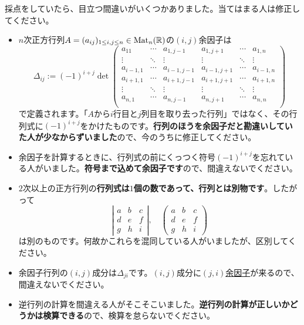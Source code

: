 採点をしていたら、目立つ間違いがいくつかありました。当てはまる人は修正してください。
\begin{itemize}
\item $n$次正方行列$A = (a_{ij})_{1 \leq i, j \leq n} \in \operatorname{Mat}_n(\mathbb{R})$の$(i, j)$余因子は
\[
\Delta_{ij} := (-1)^{i + j} \det
\begin{pmatrix}
a_{11} & \cdots & a_{1, j-1} & a_{1, j + 1} & \cdots & a_{1, n} \\
\vdots & \ddots & \vdots & \vdots & \ddots & \vdots \\
a_{i - 1, 1} & \cdots & a_{i - 1, j-1} & a_{i - 1, j + 1} & \cdots & a_{i - 1, n} \\
a_{i + 1, 1} & \cdots & a_{i + 1, j-1} & a_{i + 1, j + 1} & \cdots & a_{i + 1, n} \\
\vdots & \ddots & \vdots & \vdots & \ddots & \vdots \\
a_{n, 1} & \cdots & a_{n, j-1} & a_{n, j + 1} & \cdots & a_{n, n} \\
\end{pmatrix}
\]
で定義されます。「$A$から$i$行目と$j$列目を取り去った行列」ではなく、その行列式に$(-1)^{i + j}$をかけたものです。\textbf{行列のほうを余因子だと勘違いしていた人が少なからずいました}ので、今のうちに修正してください。
\item 余因子を計算するときに、行列式の前にくっつく符号$(-1)^{i + j}$を忘れている人がいました。\textbf{符号まで込めて余因子です}ので、間違えないでください。
\item $2$次以上の正方行列の\textbf{行列式は$1$個の数であって、行列とは別物です}。したがって
\[
\left|
\begin{array}{ccc}
a & b & c \\
d & e & f \\
g & h & i
\end{array}
\right|, \quad
\left(
\begin{array}{ccc}
a & b & c \\
d & e & f \\
g & h & i
\end{array}
\right)
\]
は別のものです。何故かこれらを混同している人がいましたが、区別してください。
\item 余因子行列の$(i, j)$成分は$\Delta_{ji}$です。$(i, j)$成分に\uline{$(j, i)$余因子}が来るので、間違えないでください。
\item 逆行列の計算を間違える人がそこそこいました。\textbf{逆行列の計算が正しいかどうかは検算できる}ので、検算を怠らないでください。
\end{itemize}

